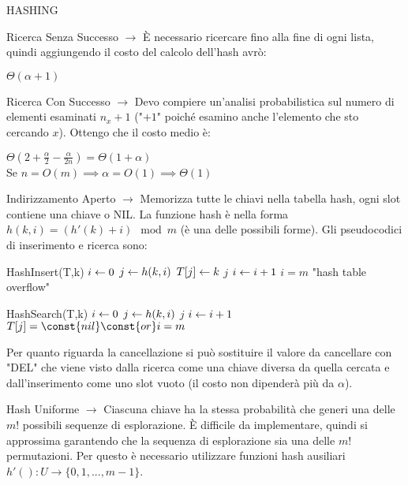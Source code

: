 \documentclass[8pt]{extarticle}
\begin{document}
\begin{formulario}
\begin{myParagraph}{HASHING}
\begin{descr}{0}
\begin{descr}{0}
\begin{descr}{0}
\begin{descr}{0}
\begin{descr}{0}
									\begin{descr}{0}
										\item[Ricerca Senza Successo] $\rightarrow$ È necessario ricercare fino alla fine di ogni lista, quindi aggiungendo il costo del calcolo dell'hash avrò:
										\begin{tcenter}
											$\Theta(\alpha+1)$
										\end{tcenter}
										\item[Ricerca Con Successo] $\rightarrow$ Devo compiere un'analisi probabilistica sul numero di elementi esaminati $n_x+1$ ("$+1$" poiché esamino anche l'elemento che sto cercando $x$). Ottengo che il costo medio è:
										\begin{tcenter}
											$\Theta(2+\frac{\alpha}{2}-\frac{\alpha}{2n})=\Theta(1+\alpha)$  \\
											Se $n=O(m) \implies \alpha=O(1) \implies \Theta(1)$
										\end{tcenter}  
 									\end{descr}
 								\end{descr}								
							\end{descr}
							\item[Indirizzamento Aperto] $\rightarrow$ Memorizza tutte le chiavi nella tabella hash, ogni slot contiene una chiave o NIL. La funzione hash è nella forma $h(k,i)=(h'(k)+i)\mod m$ (è una delle possibili forme). Gli pseudocodici di inserimento e ricerca sono:
							\begin{code}{HashInsert(T,k)}
\li $i\leftarrow0$
\li \Repeat 
	\li	 $j\leftarrow h(k,i)$
		\li	 \IF{T[j]=\const{nil}}
			\li $T[j]\leftarrow k$
			\li \Return $j$
		\li \Else
			\li $i\leftarrow i+1$ 
		\End
\li \Until $i=m$
\li \Error "hash table overflow"
							\end{code}
							\begin{code}{HashSearch(T,k)}
\li $i\leftarrow0$
\li \Repeat 
	\li	 $j\leftarrow h(k,i)$
		\li	 \IF{T[j]=k}
			\li \Return $j$
		\End
		\li $i\leftarrow i+1$
\li \Until $T[j]=\const{nil } \const{or } i=m$
\li \Return {}
							\end{code}
							Per quanto riguarda la cancellazione si può sostituire il valore da cancellare con "DEL" che viene visto dalla ricerca come una chiave diversa da quella cercata e dall'inserimento come uno slot vuoto (il costo non dipenderà più da $\alpha$).
							\begin{descr}{0}
								\item[Hash Uniforme] $\rightarrow$ Ciascuna chiave ha la stessa probabilità che generi una delle $m!$ possibili sequenze di esplorazione. È difficile da implementare, quindi si approssima garantendo che la sequenza di esplorazione sia una delle $m!$ permutazioni. Per questo è necessario utilizzare funzioni hash ausiliari $h'():U\to\{ 0,1,...,m-1 \}$.

\end{descr}
\end{descr}
\end{descr}
\end{descr}
\end{myParagraph}
\end{formulario}
\end{document}
